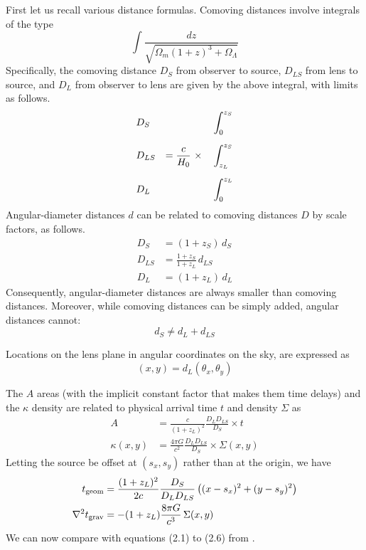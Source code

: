 \documentclass[12pt,preprint]{aastex}
\begin{document}
First let us recall various distance formulas. Comoving distances
involve integrals of the type
\begin{equation}
\int \frac{dz}{\sqrt{\Omega_m(1+z)^3 + \Omega_\Lambda}}
\end{equation}
Specifically, the comoving distance $D_S$ from observer to source,
$D_{LS}$ from lens to source, and $D_L$ from observer to lens are
given by the above integral, with limits as follows.
\begin{equation}
\begin{aligned}
&D_S    &                                &\int_0^{z_S} \\
\noalign{\medskip}
&D_{LS} & = \frac c{H_0} \ \times \quad  &\int_{z_L}^{z_S} \\
\noalign{\medskip}
&D_L    &                                &\int_0^{z_L}
\end{aligned}
\end{equation}
Angular-diameter distances $d$ can be related to comoving distances
$D$ by scale factors, as follows.
\begin{equation}
\begin{aligned}
D_S &= (1+z_S) \, d_S \\
D_{LS} &= \frac{1+z_S}{1+z_L} \, d_{LS} \\
D_L &= (1+z_L) \, d_L
\end{aligned}
\end{equation}
Consequently, angular-diameter distances are always smaller than
comoving distances.  Moreover, while comoving distances can be simply
added, angular distances cannot:
\begin{equation}
d_S \neq d_L + d_{LS}
\end{equation}

Locations on the lens plane in angular coordinates on the sky, are
expressed as
\begin{equation}
(x,y) = d_L (\theta_x,\theta_y)
\end{equation}

The $A$ areas (with the implicit
constant factor that makes them time delays) and the $\kappa$ density are related to physical arrival
time $t$ and density $\Sigma$ as
\begin{equation}
\begin{aligned}
A           &= \frac{c}{(1+z_L)^2} \frac{D_L D_{LS}}{D_S} \times t \\
\kappa(x,y) &= \frac{4\pi G}{c^2} \frac{D_L D_{LS}}{D_S}
               \times \Sigma(x,y)
\end{aligned}
\end{equation}
Letting the source be offset at $(s_x,s_y)$ rather than at the
origin, we have
\begin{equation}
\begin{aligned}
t_{\rm geom} &= \frac{(1+z_L)^2}{2c} \frac{D_S}{D_L D_{LS}}
\left( (x-s_x)^2 + (y-s_y)^2 \right) \\
\nabla^2 t_{\rm grav} &= -(1+z_L)\frac{8\pi G}{c^3} \, \Sigma(x,y)
\end{aligned}
\end{equation}
We can now compare with equations (2.1) to (2.6)
from \cite{1986ApJ...310..568B}.
\end{document}
